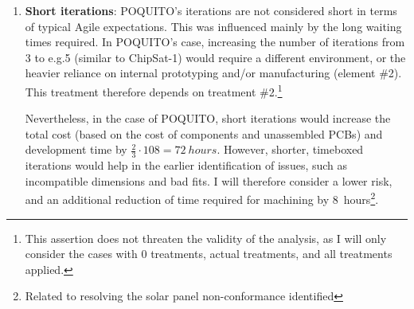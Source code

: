 \documentclass[a4paper,nobib,justified,final]{tufte-book}
\begin{document}
\begin{enumerate}
	I consider it highly likely that this approach would detect and prevent most or all non-conformances noted in , thus leading to a successful development of the spacecraft. While both sequential and iterative development would lead to a successfully operating spacecraft, I consider that spending more time on \emph{early design} would lead to a potentially simpler design, e.g.\@ by simplifying POQUITO's harnessing, or by deciding to use a simpler communication protocol\footnote{E.g.\@ \acs{UART} instead of \acs{CAN}.}. Thus, I will consider that multi-step development increases risk. This is also influenced by POQUITO's more complex nature compared to previous missions, leading to a higher potential inertia against later design changes. Finally, I will also consider a significant increase in total manufacturing cost for a multi-step lifecycle process (based on the costs of individual \acsp{PCB} and elements).

	\item \textbf{Short iterations}:
	POQUITO's iterations are not considered short in terms of typical Agile expectations. This was influenced mainly by the long waiting times required. In POQUITO's case, increasing the number of iterations from 3 to e.g.\@ 5 (similar to ChipSat-1) would require a different environment, or the heavier reliance on internal prototyping and/or manufacturing (element \#2). This treatment therefore depends on treatment \#2.\footnote{This assertion does not threaten the validity of the analysis, as I will only consider the cases with 0 treatments, actual treatments, and all treatments applied.}
	
	Nevertheless, in the case of POQUITO, short iterations would increase the total cost (based on the cost of components and unassembled \acsp{PCB}) and development time by \( \frac{2}{3} \cdot 108 = \qty{72}{hours} \). However, shorter, timeboxed iterations would help in the earlier identification of issues, such as incompatible dimensions and bad fits. I will therefore consider a lower risk,  and an additional reduction of time required for machining by \qty{8}{hours}\footnote{Related to resolving the solar panel non-conformance identified}.

	

\end{enumerate}
\end{document}
